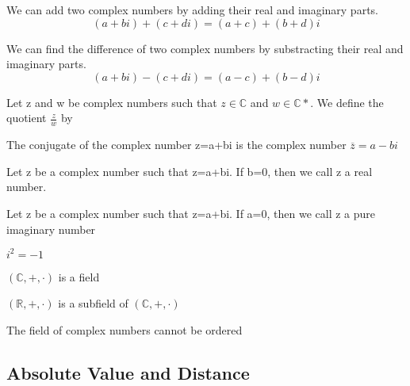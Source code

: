 \documentclass{article}
\begin{document}
\begin{definition}[Addition]
    We can add two complex numbers by adding their real and imaginary parts.
    $$ (a+bi) + (c+di) = (a+c) + (b+d) i$$
\end{definition}

\begin{definition}[Substraction]
    We can find the difference of two complex numbers by substracting their real
    and imaginary parts.
    $$ (a+bi) - (c+di) = (a-c) + (b-d) i$$
\end{definition}

\begin{definition}[Division]
    Let z and w be complex numbers such that $z \in \mathbb{C}$ and
    $w \in \mathbb{C}*$. We define the quotient $\frac{z}{w}$ by
\end{definition}

\begin{definition}[Conjugate]
    The conjugate of the complex number z=a+bi is the complex number
    $\overline{z} = a - bi $
\end{definition}

\begin{definition}
    Let z be a complex number such that z=a+bi. If b=0, then we call z a real
    number.
\end{definition}

\begin{definition}
    Let z be a complex number such that z=a+bi. If a=0, then we call z a pure
    imaginary number
\end{definition}

\begin{theorem}
    $i^2 = -1$
\end{theorem}

\begin{theorem}
    $ (\mathbb{C}, +, \cdot)$ is a field
\end{theorem}

\begin{corollary}
    $ (\mathbb{R}, +, \cdot)$ is a subfield of $ (\mathbb{C}, +, \cdot)$
\end{corollary}

\begin{theorem}
    The field of complex numbers cannot be ordered
\end{theorem}

\subsection{Absolute Value and Distance}
\end{document}
